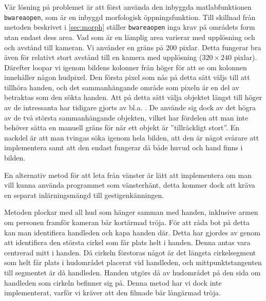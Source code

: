 Vår lösning på problemet är att först använda den inbyggda
matlabfunktionen \texttt{bwareaopen}, som är en inbyggd morfologisk
öppningsfunktion. Till skillnad från metoden beskrivet i
\ref{sec:morph} ställer \texttt{bwareaopen} inga
krav på områdets form utan endast dess area. Vad som är en lämplig area
varierar med upplösning och
och avstånd till kameran. Vi använder en gräns på 200
pixlar. Detta fungerar bra även för relativt stort avstånd till
 en kamera med upplösning ($320\times240$ pixlar). Därefter loopar vi
igenom bildens kolonner från
höger för att se om kolonnen innehåller någon hudpixel. Den första
pixel som nås på detta sätt väljs till att tillhöra handen, och det
sammanhängande område som pixeln är en del av betraktas som den sökta
handen. Att på detta sätt välja objektet längst till höger av de
intressanta har tidigare gjorts av bl.a. . De använde
sig dock av det högra av de två största sammanhängande objekten,
vilket har fördelen att man inte behöver sätta en manuell gräns för
när ett objekt är ''tillräckligt stort''. En nackdel är att man tvingas
söka igenom hela bilden, att den är något svårare att
implementera samt att den endast fungerar då både huvud och hand finns
i bilden.

En alternativ metod för att leta från
vänster är lätt att implementera om man vill kunna använda programmet
som vänsterhänt, detta kommer dock att kräva en
separat inlärningsmängd till gestigenkänningen.

Metoden plockar med all hud som hänger samman med
handen, inklusive armen om personen framför kameran bär kortärmad tröja. För att
råda bot på detta kan man identifiera handleden och kapa handen
där. Detta har gjordes av  genom att identifiera den största cirkel
som får plats helt i handen. Denna antas vara centrerad mitt i handen. Då
cirkeln förstoras något är det längsta cirkelsegment som helt får
plats i hudområdet placerat vid handleden, och mittpunktstangenten
till segmentet är då handleden. Handen utgörs då av hudområdet på den
sida om handleden som cirkeln befinner sig på. Denna metod har vi dock
inte implementerat, varför vi kräver att den filmade bär
långärmad tröja. 
